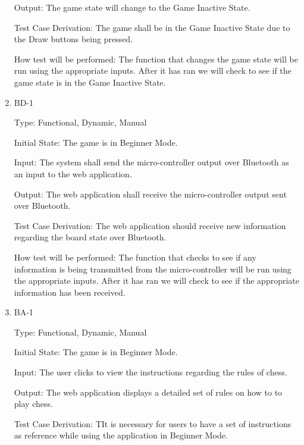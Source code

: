 \documentclass[12pt, titlepage]{article}
\begin{document}
\begin{enumerate}
      Output: The game state will change to the Game Inactive State.
                          
      Test Case Derivation: The game shall be in the Game Inactive State due to the Draw buttons being pressed.
      
      How test will be performed: The function that changes the game state will be run using the appropriate inputs.
      After it has ran we will check to see if the game state is in the Game Inactive State.
  
      \item{BD-1\\}
  
      Type: Functional, Dynamic, Manual
                        
      Initial State: The game is in Beginner Mode.
                          
      Input: The system shall send the micro-controller output over Bluetooth as an input to the web application.
                          
      Output: The web application shall receive the micro-controller output sent over Bluetooth.
                          
      Test Case Derivation: The web application should receive new information regarding the board state over Bluetooth. 
  
      How test will be performed: The function that checks to see if any information is being transmitted from the micro-controller
      will be run using the appropriate inputs. After it has ran we will check to see if the appropriate information has been received.
  
      \item{BA-1\\}
  
      Type: Functional, Dynamic, Manual
                        
      Initial State: The game is in Beginner Mode.
                          
      Input: The user clicks to view the instructions regarding the rules of chess.
                          
      Output: The web application displays a detailed set of rules on how to to play chess.
                          
      Test Case Derivation: TIt is necessary for users to have a set of instructions as reference while
      using the application in Beginner Mode.
  

\end{enumerate}
\end{document}
